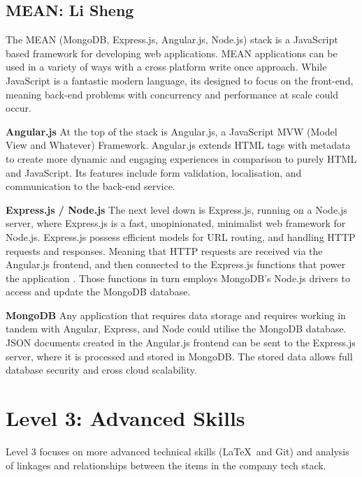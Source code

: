 \documentclass[a4paper, 11pt]{report}
\begin{document}
\subsection{MEAN: Li Sheng}

The MEAN (MongoDB, Express.js, Angular.js, Node.js) stack is a JavaScript based framework for developing web applications. MEAN applications can be used in a variety of ways with a cross platform write once approach. While JavaScript is a fantastic modern language, its designed to focus on the front-end, meaning back-end problems with concurrency and performance at scale could occur.\cite{ali5}

\textbf{Angular.js}
At the top of the stack is Angular.js, a JavaScript MVW (Model View and Whatever) Framework. Angular.js extends HTML tags with metadata to create more dynamic and engaging experiences in comparison to purely HTML and JavaScript. Its features include form validation, localisation, and communication to the back-end service.

\textbf{Express.js / Node.js}
The next level down is Express.js, running on a Node.js server, where Express.js is a fast, unopinionated, minimalist web framework for Node.js. Express.js possess efficient models for URL routing, and handling HTTP requests and responses. Meaning that HTTP requests are received via the Angular.js frontend, and then connected to the Express.js functions that power the application \cite{ali5}. Those functions in turn employs MongoDB’s Node.js drivers to access and update the MongoDB database.

\textbf{MongoDB}
Any application that requires data storage and requires working in tandem with Angular, Express, and Node could utilise the MongoDB database. JSON documents created in the Angular.js frontend can be sent to the Express.js server, where it is processed and stored in MongoDB. The stored data allows full database security and cross cloud scalability.


\newpage
\section{Level 3: Advanced Skills}

Level 3 focuses on more advanced technical skills (\LaTeX\ and Git) and analysis of linkages and relationships between the items in the company tech stack.
\end{document}
